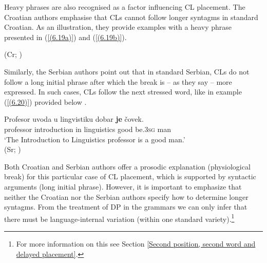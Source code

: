 \noindent Heavy phrases are also recognised as a factor influencing CL placement. The Croatian authors \citet[246]{TezakBabic96} emphasise that CLs cannot follow longer syntagms in standard Croatian. As an illustration, they provide examples with a heavy phrase presented in (\ref{(6.19a)}) and (\ref{(6.19b)}). 

\begin{exe}\ex\begin{xlist}
\hfill (Cr; \citealt[246]{TezakBabic96})
\end{xlist}
\end{exe}

\noindent Similarly, the Serbian authors \citet[450]{PiperKlajn14} point out that in standard Serbian, CLs do not follow a long initial phrase after which the break is – as they say – more expressed. In such cases, CLs follow the next stressed word, like in example (\ref{(6.20)}) provided below \citep[cf.][450]{PiperKlajn14}.

\begin{exe}\ex\label{(6.20)}
\gll Profesor uvoda u lingvistiku dobar \textbf{je} čovek.\\
 professor introduction in linguistics good be\textsc{.3sg} man \\
\glt ‘The Introduction to Linguistics professor is a good man.’ \\
\hfill (Sr; \citealt[450]{PiperKlajn14})
\end{exe}

\noindent Both Croatian and Serbian authors offer a prosodic explanation (physiological break) for this particular case of CL placement, which is supported by syntactic arguments (long initial phrase). However, it is important to emphasize that neither the Croatian nor the Serbian authors specify how to determine longer syntagms. From the treatment of DP in the grammars we can only infer that there must be language-internal variation (within one standard variety).\footnote{For more information on this see Section \ref{Second position, second word and delayed placement}. } 

